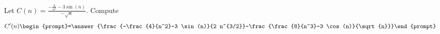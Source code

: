 \documentclass{ximera}
\author{Bart Snapp}
\begin{document}
\begin{exercise}
Let $C(n) = \frac{ -\frac{4}{n^2}-3 \sin (n)}{-\sqrt{n}}$. Compute
\[
C'(n)
\begin{prompt}=\answer{\frac{-\frac{4}{n^2}-3 \sin (n)}{2 n^{3/2}}-\frac{\frac{8}{n^3}-3 \cos (n)}{\sqrt{n}}}\end{prompt}
\]
\end{exercise}
\end{document}
